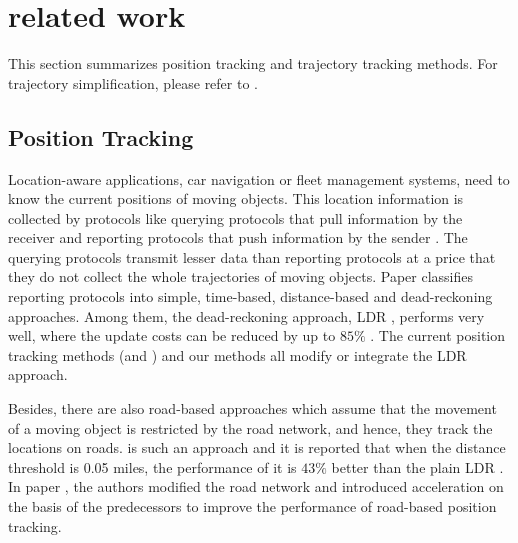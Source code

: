 
\section{related work}
\label{sec-related}

This section summarizes position tracking and trajectory tracking methods. For trajectory simplification, please refer to \cite{Zhang:Evaluation, Lin:Cised}.

\subsection{{Position Tracking}}

Location-aware applications, \eg car navigation or fleet management systems, need to know the current positions of moving objects. 
This location information is collected by protocols like querying protocols that pull information by the receiver and reporting protocols that push information by the sender \cite{Leonhardi:Comparison}.
The querying protocols transmit lesser data than reporting protocols at a price that they do not collect the whole trajectories of moving objects.
Paper \cite{Leonhardi:Comparison} classifies reporting protocols into simple, time-based, distance-based and dead-reckoning approaches. Among them, the dead-reckoning approach, \textcolor{blue}{\eg} LDR \cite{Wolfson:PositionTracking, Wolfson:PlainDR}, performs very well, where the update costs can be reduced by up to $85\%$ \cite{Wolfson:PositionTracking}. The current position tracking methods (\ldrh and \grts) and our methods all modify or integrate the LDR approach.

Besides, there are also road-based approaches \cite{Civilis:Techniques, Civilis:RoadTracking, Wolfson:RoadTracking} which assume that the movement of a moving object is restricted by the road network, and hence, they track the locations on roads. \cite{Wolfson:RoadTracking} is such an approach and it is reported that when the distance threshold is 0.05 miles, the performance of it is $43\%$ better than the plain LDR \cite{Wolfson:PlainDR}. 
In paper \cite{Civilis:Techniques}, the authors modified the road network and introduced acceleration on the basis of the predecessors to improve the performance of road-based position tracking.

